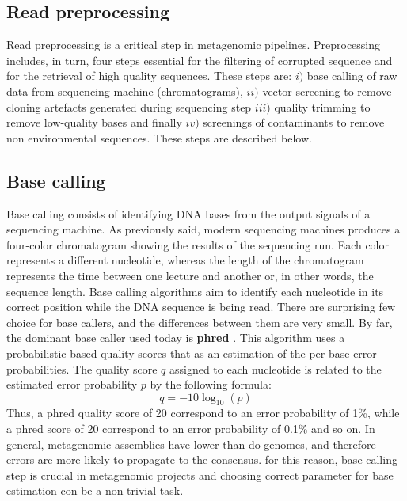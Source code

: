\subsection{Read preprocessing}
Read preprocessing is a critical step in metagenomic pipelines. Preprocessing includes, in turn, four steps essential for the filtering of corrupted sequence and for the retrieval of high quality sequences. These steps are: $i)$ base calling of raw data from sequencing machine (chromatograms), $ii)$ vector screening to remove cloning artefacts generated during sequencing step $iii)$ quality trimming to remove low-quality bases and finally $iv)$ screenings of contaminants to remove non environmental sequences. These steps are described below.\\
\subsection*{Base calling}
Base calling consists of identifying DNA bases from the output signals of a sequencing machine. As previously said, modern sequencing machines produces a four-color chromatogram showing the results of the sequencing run. Each color represents a different nucleotide, whereas the length of the chromatogram represents the time between one lecture and another or, in other words, the sequence length. Base calling algorithms aim to identify each nucleotide in its correct position while the DNA sequence is being read. There are surprising few choice for base callers, and the differences between them are very small. By far, the dominant base caller used today is \textbf{phred} \cite{ewing1998base}. This algorithm uses a probabilistic-based quality scores that as an estimation of the per-base error probabilities. The quality score $q$ assigned to each nucleotide is related to the estimated error probability $p$ by the following formula:\\
\begin{equation*}
q = -10 \log_{10}(p)
\end{equation*}
Thus, a phred quality score of 20 correspond to an error probability of 1\%, while a phred score of 20 correspond to an error probability of 0.1\% and so on. In general, metagenomic assemblies have lower than do genomes, and therefore errors are more likely to propagate to the consensus. for this reason, base calling step is crucial in metagenomic projects and choosing correct parameter for base estimation con be a non trivial task.\\

